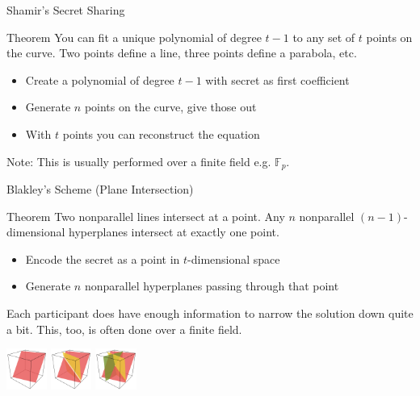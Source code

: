\documentclass[12pt]{beamer}
\begin{document}
\begin{frame}{Shamir's Secret Sharing}
	\begin{block}{Theorem}
		You can fit a unique polynomial of degree $t-1$ to any set of $t$ points
		on the curve. Two points define a line, three points define a parabola,
		etc.
	\end{block}

	\begin{itemize}
		\item Create a polynomial of degree $t-1$ with secret as first
			coefficient
		\item Generate $n$ points on the curve, give those out
		\item With $t$ points you can reconstruct the equation
	\end{itemize}

	\begin{alertblock}{}
		Note: This is usually performed over a finite field e.g. $\mathbb{F}_p$.
	\end{alertblock}
\end{frame}

\begin{frame}{Blakley's Scheme (Plane Intersection)}
	\begin{block}{Theorem}
		Two nonparallel lines intersect at a point. Any $n$ nonparallel
		$(n-1)$-dimensional hyperplanes intersect at exactly
		one point.
	\end{block}

	\begin{itemize}
		\item Encode the secret as a point in $t$-dimensional space
		\item Generate $n$ nonparallel hyperplanes passing through that point
	\end{itemize}

	\begin{alertblock}{}
		Each participant does have enough information to narrow the solution
		down quite a bit. This, too, is often done over a finite field.
	\end{alertblock}

	\centering
	\includegraphics[width=0.1\textwidth]{./pictures/ss_planes1}
	\includegraphics[width=0.1\textwidth]{./pictures/ss_planes2}
	\includegraphics[width=0.1\textwidth]{./pictures/ss_planes3}
\end{frame}
\end{document}
